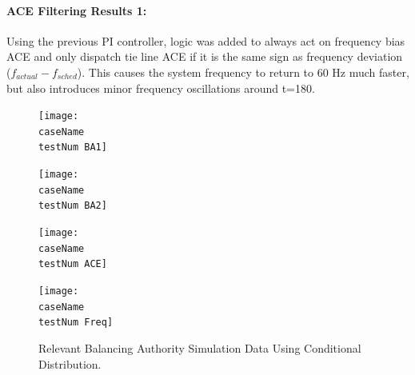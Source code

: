\documentclass[12pt]{article}
\begin{document}
\paragraph{ACE Filtering Results 1:} Using the previous PI controller, logic was added to always act on frequency bias ACE and only dispatch tie line ACE if it is the same sign as frequency deviation ($f_{actual} - f_{sched}$). This causes the system frequency to return to 60 Hz much faster, but also introduces minor frequency oscillations around t=180.
\renewcommand{\testNum}{1}
\begin{figure}[h!]
		\centering
		\texttt{[image: \\caseName\\testNum BA1]}\vspace{-1em}
\end{figure}\vspace{-1.5em}
\begin{figure}[h!]
		\centering
		\texttt{[image: \\caseName\\testNum BA2]}\vspace{-1em}
\end{figure}\vspace{-1.5em}
\begin{figure}[h!]
		\centering
		\texttt{[image: \\caseName\\testNum ACE]}\vspace{-1em}
\end{figure}\vspace{-1.5em}
\begin{figure}[h!]
		\centering
		\texttt{[image: \\caseName\\testNum Freq]}\vspace{-1em}
		\caption{Relevant Balancing Authority Simulation Data Using Conditional Distribution.}
		\label{PI 1 Results}		 
\end{figure}\vspace{-1.5em}
\pagebreak
\end{document}
